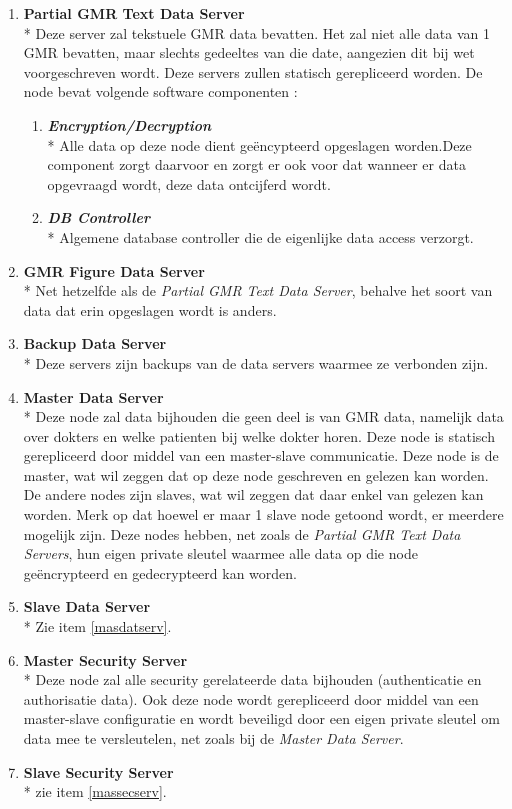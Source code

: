 \documentclass[a4paper,10pt]{article}
\begin{document}
\begin{enumerate}
\item \textbf{Partial GMR Text Data Server}\\*
Deze server zal tekstuele GMR data bevatten. Het zal niet alle data van 1 GMR bevatten, maar slechts gedeeltes van die date, aangezien dit bij wet voorgeschreven wordt. Deze servers zullen statisch gerepliceerd worden. De node bevat volgende software componenten : 
\begin{enumerate}
 \item \textit{\textbf{Encryption/Decryption}}\\*
Alle data op deze node dient geëncypteerd opgeslagen worden.Deze component zorgt daarvoor en zorgt er ook voor dat wanneer er data opgevraagd wordt, deze data ontcijferd wordt.
\item \textit{\textbf{DB Controller}}\\*
Algemene database controller die de eigenlijke data access verzorgt.
\end{enumerate}

\item \textbf{GMR Figure Data Server}\\*
Net hetzelfde als de \textit{Partial GMR Text Data Server}, behalve het soort van data dat erin opgeslagen wordt is anders.

\item \textbf{Backup Data Server}\\*
Deze servers zijn backups van de data servers waarmee ze verbonden zijn.

\item \textbf{Master Data Server}\\*
\label{masdatserv}
Deze node zal data bijhouden die geen deel is van GMR data, namelijk data over dokters en welke patienten bij welke dokter horen. Deze node is statisch gerepliceerd door middel van een master-slave communicatie. Deze node is de master, wat wil zeggen dat op deze node geschreven en gelezen kan worden. De andere nodes zijn slaves, wat wil zeggen dat daar enkel van gelezen kan worden. Merk op dat hoewel er maar 1 slave node getoond wordt, er meerdere mogelijk zijn. Deze nodes hebben, net zoals de \textit{Partial GMR Text Data Servers}, hun eigen private sleutel waarmee alle data op die node geëncrypteerd en gedecrypteerd kan worden.
\item \textbf{Slave Data Server}\\*
Zie item \ref{masdatserv}.

\item \textbf{Master Security Server}\\*
\label{massecserv}
Deze node zal alle security gerelateerde data bijhouden (authenticatie en authorisatie data). Ook deze node wordt gerepliceerd door middel van een master-slave configuratie en wordt beveiligd door een eigen private sleutel om data mee te versleutelen, net zoals bij de \textit{Master Data Server}.
\item \textbf{Slave Security Server}\\*
zie item \ref{massecserv}.


\end{enumerate}
\end{document}
